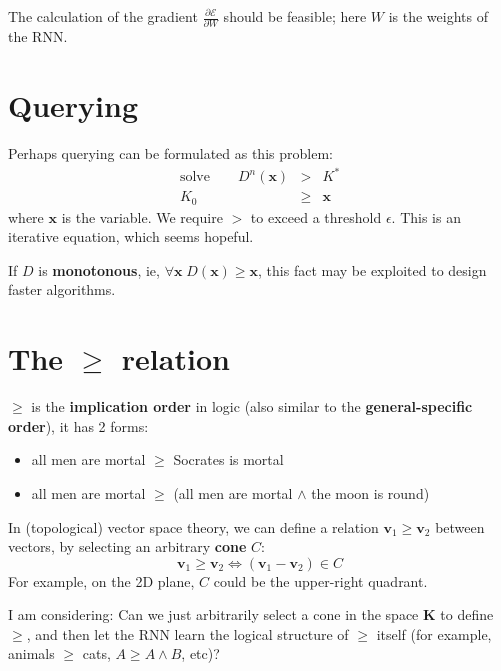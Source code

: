 \documentclass[12pt]{article}
\begin{document}
The calculation of the gradient $\frac{\partial \mathcal{E}}{\partial W}$ should be feasible;  here $W$ is the weights of the RNN.


\section{Querying}

Perhaps querying can be formulated as this problem:
\begin{eqnarray}
\mbox{solve}\quad\quad D^n(\mathbf{x}) & > & K^* \nonumber \\
K_0 & \ge & \mathbf{x} \nonumber
\end{eqnarray}
where $\mathbf{x}$ is the variable.  We require $>$ to exceed a threshold $\epsilon$.  This is an iterative equation, which seems hopeful.

If $D$ is \textbf{monotonous}, ie, $\forall \mathbf{x} \; D(\mathbf{x}) \ge \mathbf{x}$, this fact may be exploited to design faster algorithms.

\section{The \texorpdfstring{$\ge$}{>} relation}

$\ge$ is the \textbf{implication order} in logic (also similar to the \textbf{general-specific order}), it has 2 forms:
\begin{itemize}
\item all men are mortal $\ge$ Socrates is mortal
\item all men are mortal $\ge$ (all men are mortal $\wedge$ the moon is round)
\end{itemize}

In (topological) vector space theory, we can define a relation $\mathbf{v}_1 \ge \mathbf{v}_2$ between vectors, by selecting an arbitrary \textbf{cone} $C$:
$$ \mathbf{v}_1 \ge \mathbf{v}_2 \Leftrightarrow (\mathbf{v}_1 - \mathbf{v}_2) \in C $$
For example, on the 2D plane, $C$ could be the upper-right quadrant.

I am considering:  Can we just arbitrarily select a cone in the space $\mathbf{K}$ to define $\ge$, and then let the RNN learn the logical structure of $\ge$ itself (for example, animals $\ge $ cats, $A \ge A \wedge B$, etc)?
\end{document}
